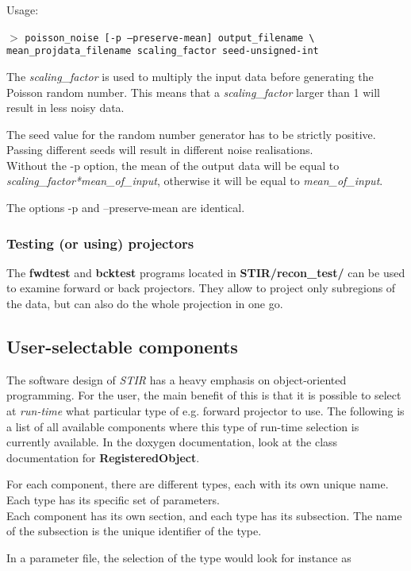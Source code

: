 \documentclass{article}
\newcommand{\cmdline}[1]{\par \noindent $>$ \texttt{#1}\par}
\begin{document}
Usage:
\cmdline{poisson\_noise [-p {\textbar} --preserve-mean] output\_filename 
{\textbackslash}\\
mean\_projdata\_filename scaling\_factor seed-unsigned-int}


The \textit{scaling\_factor} is used to multiply the input data before 
generating the Poisson random number. This means that a \textit{scaling\_factor} 
larger than 1 will result in less noisy data.


The seed value for the random number generator has to be strictly 
positive. Passing different seeds will result in different noise 
realisations.\\
Without the -p option, the mean of the output data will be equal 
to \textit{scaling\_factor*mean\_of\_input}, otherwise it will be equal 
to \textit{mean\_of\_input}.


The options -p and --preserve-mean are identical.


\subsubsection{
Testing (or using) projectors}

The \textbf{fwdtest} and \textbf{bcktest} programs located in \textbf{STIR/recon\_test/} can 
be used to examine forward or back projectors. They allow to 
project only subregions of the data, but can also do the whole 
projection in one go. 


\subsection{
User-selectable components}
\label{sec:user-selectablecomponents}
The software design of \textit{STIR} has a heavy emphasis on object-oriented 
programming. For the user, the main benefit of this is that it 
is possible to select at \textit{run-time} what particular type of 
e.g. forward projector to use. The following is a list of all 
available components where this type of run-time selection is 
currently available. In the doxygen documentation, look at the 
class documentation for \textbf{RegisteredObject}.


For each component, there are different types, each with its 
own unique name. Each type has its specific set of parameters. 
\\
Each component has its own section, and each type has its subsection. 
The name of the subsection is the unique identifier of the type.


In a parameter file, the selection of the type would look for 
instance as
\end{document}
